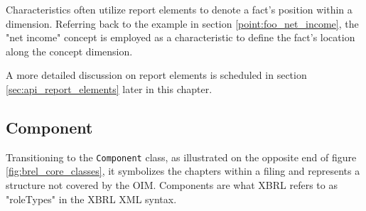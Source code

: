 Characteristics often utilize report elements to denote a fact's position within a dimension.
Referring back to the example in section \ref{point:foo_net_income}, the "net income" concept is employed as a characteristic to define the fact's location along the concept dimension.


A more detailed discussion on report elements is scheduled in section \ref{sec:api_report_elements} later in this chapter.

\subsection{Component}


Transitioning to the \texttt{Component} class, as illustrated on the opposite end of figure \ref{fig:brel_core_classes}, 
it symbolizes the chapters within a filing and represents a structure not covered by the OIM.
Components are what XBRL refers to as "roleTypes" in the XBRL XML syntax.

